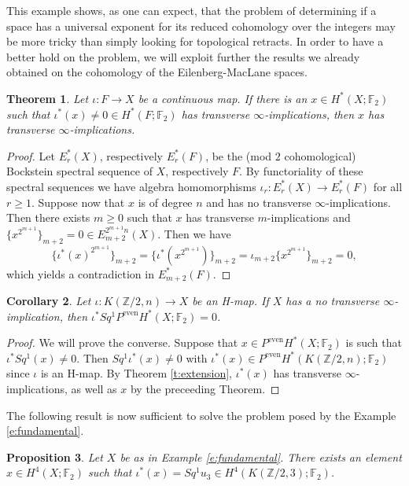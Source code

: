 \documentclass[11pt,a4paper]{amsart}
\theoremstyle{plain}
\newtheorem{thm}{Theorem}[section]
\newtheorem{prop}[thm]{Proposition}
\newtheorem{cor}[thm]{Corollary}
\theoremstyle{definition}
\theoremstyle{remark}
\newcommand{\Z}{\mathbb{Z}}
\newcommand{\F}{\mathbb{F}}
\renewcommand{\geq}{\geqslant}
\begin{document}
This example shows, as one can expect, that the problem of determining if a space has a universal exponent for its reduced cohomology over the integers may be more tricky than simply looking for topological retracts. In order to have a better hold on the problem, we will exploit further the results we already obtained on the cohomology of the Eilenberg-MacLane spaces.

\begin{thm}
Let $\iota:F\to X$ be a continuous map. If there is an $x\in H^*(X;\F_2)$ such that $\iota^*(x)\not=0\in H^*(F;\F_2)$ has transverse $\infty$-implications, then $x$ has transverse $\infty$-implications.
\end{thm}

\begin{proof}
Let $E_r^*(X)$, respectively $E_r^*(F)$, be the (mod $2$ cohomological) Bockstein spectral sequence of $X$, respectively $F$. By functoriality of these spectral sequences we have algebra homomorphisms $\iota_r:E_r^*(X)\to E_r^*(F)$ for all $r\geq1$. Suppose now that $x$ is of degree $n$ and has no transverse $\infty$-implications. Then there exists $m\geq0$ such that $x$ has transverse $m$-implications and $\{x^{2^{m+1}}\}_{m+2}=0\in E_{m+2}^{2^{m+1} n}(X)$. Then we have
$$
\{\iota^*(x)^{2^{m+1}}\}_{m+2}=\{\iota^*(x^{2^{m+1}})\}_{m+2}=\iota_{m+2}\{x^{2^{m+1}}\}_{m+2}=0,
$$ which yields a contradiction in $E_{m+2}^*(F)$.
\end{proof}

\begin{cor}
Let $\iota:K(\Z/2,n)\to X$ be an H-map. If $X$ has a no transverse $\infty$-implication, then $\iota^*Sq^1P^\text{even}H^*(X;\F_2)=0$.
\end{cor}

\begin{proof}
We will prove the converse. Suppose that $x\in P^\text{even}H^*(X;\F_2)$ is such that $\iota^*Sq^1(x)\not=0$. Then $Sq^1\iota^*(x)\not=0$ with $\iota^*(x)\in P^\text{even}H^*(K(\Z/2,n);\F_2)$ since $\iota$ is an H-map. By Theorem \ref{t:extension}, $\iota^*(x)$ has transverse $\infty$-implications, as well as $x$ by the preceeding Theorem.
\end{proof}

The following result is now sufficient to solve the problem posed by the Example \ref{e:fundamental}.

\begin{prop}
Let $X$ be as in Example \ref{e:fundamental}. There exists an element $x\in H^4(X;\F_2)$ such that $\iota^*(x)=Sq^1u_3\in H^4(K(\Z/2,3);\F_2)$.
\end{prop}
\end{document}
